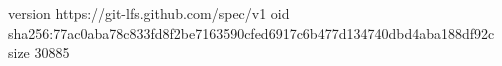 version https://git-lfs.github.com/spec/v1
oid sha256:77ac0aba78c833fd8f2be7163590cfed6917c6b477d134740dbd4aba188df92c
size 30885
